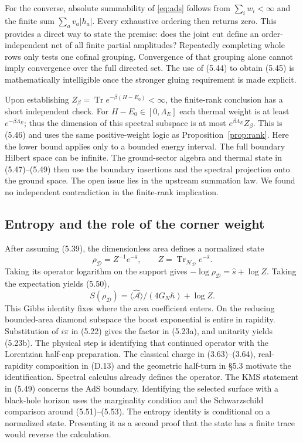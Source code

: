 \documentclass[11pt]{article}
\newcommand{\Tr}{\operatorname{Tr}}
\newcommand{\HH}{\mathcal H_{\mathcal D}}
\newcommand{\areaop}{\hat s}
\begin{document}
For the converse, absolute summability of \eqref{eq:ads} follows from $\sum_i w_i<\infty$ and the finite sum $\sum_a v_a|h_a|$. Every exhaustive ordering then returns zero. This provides a direct way to state the premise: does the joint cut define an order-independent net of all finite partial amplitudes? Repeatedly completing whole rows only tests one cofinal grouping. Convergence of that grouping alone cannot imply convergence over the full directed set. The use of (5.44) to obtain (5.45) is mathematically intelligible once the stronger gluing requirement is made explicit.

Upon establishing $Z_\beta=\Tr e^{-\beta(H-E_0)}<\infty$, the finite-rank conclusion has a short independent check. For $H-E_0\in[0,\Lambda_E]$ each thermal weight is at least $e^{-\beta\Lambda_E}$; thus the dimension of this spectral subspace is at most $e^{\beta\Lambda_E}Z_\beta$. This is (5.46) and uses the same positive-weight logic as Proposition~\ref{prop:rank}. Here the lower bound applies only to a bounded energy interval. The full boundary Hilbert space can be infinite. The ground-sector algebra and thermal state in (5.47)--(5.49) then use the boundary insertions and the spectral projection onto the ground space. The open issue lies in the upstream summation law. We found no independent contradiction in the finite-rank implication.

\subsection{Entropy and the role of the corner weight}
After assuming (5.39), the dimensionless area defines a normalized state
\[
 \rho_{\mathcal D}=Z^{-1}e^{-\areaop},\qquad
 Z=\Tr_{\HH} e^{-\areaop}.
\]
Taking its operator logarithm on the support gives $-\log\rho_{\mathcal D}=\areaop+\log Z$. Taking the expectation yields (5.50),
\[
 S(\rho_{\mathcal D})=\langle\widehat{\mathcal A}\rangle/(4G_N\hbar)+\log Z .
\]
This Gibbs identity fixes where the area coefficient enters. On the reducing bounded-area diamond subspace the boost exponential is entire in rapidity. Substitution of $i\pi$ in (5.22) gives the factor in (5.23a), and unitarity yields (5.23b). The physical step is identifying that continued operator with the Lorentzian half-cap preparation. The classical charge in (3.63)--(3.64), real-rapidity composition in (D.13) and the geometric half-turn in \S5.3 motivate the identification. Spectral calculus already defines the operator. The KMS statement in (5.49) concerns the AdS boundary. Identifying the selected surface with a black-hole horizon uses the marginality condition and the Schwarzschild comparison around (5.51)--(5.53). The entropy identity is conditional on a normalized state. Presenting it as a second proof that the state has a finite trace would reverse the calculation.
\end{document}
